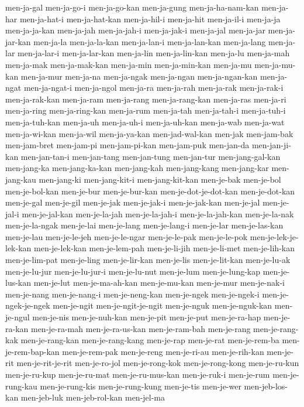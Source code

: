{men-ja-gal men-ja-go-i men-ja-go-kan men-ja-gung men-ja-ha-nam-kan
men-ja-har men-ja-hat-i men-ja-hat-kan men-ja-hil-i men-ja-hit men-ja-il-i
men-ja-ja men-ja-ja-kan men-ja-jah men-ja-jah-i men-ja-jak-i men-ja-jal
men-ja-jar men-ja-jar-kan men-ja-la men-ja-la-kan men-ja-lan-i
men-ja-lan-kan men-ja-lang men-ja-lar men-ja-lar-i men-ja-lar-kan
men-ja-lin men-ja-lin-kan men-ja-lu men-ja-mah men-ja-mak men-ja-mak-kan
men-ja-min men-ja-min-kan men-ja-mu men-ja-mu-kan men-ja-mur men-ja-na
men-ja-ngak men-ja-ngan men-ja-ngan-kan men-ja-ngat men-ja-ngat-i
men-ja-ngol men-ja-ra men-ja-rah men-ja-rak men-ja-rak-i men-ja-rak-kan
men-ja-ram men-ja-rang men-ja-rang-kan men-ja-ras men-ja-ri men-ja-ring
men-ja-ring-kan men-ja-rum men-ja-tah men-ja-tah-i men-ja-tuh-i
men-ja-tuh-kan men-ja-uh men-ja-uh-i men-ja-uh-kan men-ja-wab men-ja-wat
men-ja-wi-kan men-ja-wil men-ja-ya-kan men-jad-wal-kan men-jak men-jam-bak
men-jam-bret men-jam-pi men-jam-pi-kan men-jam-puk men-jan-da
men-jan-ji-kan men-jan-tan-i men-jan-tang men-jan-tung men-jan-tur
men-jang-gal-kan men-jang-ka men-jang-ka-kan men-jang-kah men-jang-kang
men-jang-kar men-jang-kau men-jang-ki men-jang-kit-i men-jang-kit-kan
men-je-bak men-je-bol men-je-bol-kan men-je-bur men-je-bur-kan
men-je-dot-je-dot-kan men-je-dot-kan men-je-gal men-je-gil men-je-jak
men-je-jak-i men-je-jak-kan men-je-jal men-je-jal-i men-je-jal-kan
men-je-la-jah men-je-la-jah-i men-je-la-jah-kan men-je-la-nak
men-je-la-ngak men-je-lai men-je-lang men-je-lang-i men-je-lar
men-je-las-kan men-je-lau men-je-le-jeh men-je-le-ngar men-je-le-pak
men-je-le-pok men-je-lek-je-lek-kan men-je-lek-kan men-je-lem-pah
men-je-li-jih men-je-li-met men-je-lih-kan men-je-lim-pat men-je-ling
men-je-lir-kan men-je-lis men-je-lit-kan men-je-lu-ak men-je-lu-jur
men-je-lu-jur-i men-je-lu-nut men-je-lum men-je-lung-kap men-je-lus-kan
men-je-lut men-je-ma-ah-kan men-je-mu-kan men-je-mur men-je-nak-i
men-je-nang men-je-nang-i men-je-neng-kan men-je-ngek men-je-ngek-i
men-je-ngek-je-ngek men-je-ngit men-je-ngit-je-ngit men-je-nguk
men-je-nguk-kan men-je-ngul men-je-nis men-je-nuh-kan men-je-pit
men-je-put men-je-ra-hap men-je-ra-kan men-je-ra-mah men-je-ra-us-kan
men-je-ram-bah men-je-rang men-je-rang-kak men-je-rang-kan
men-je-rang-kang men-je-rap men-je-rat men-je-rem-ba men-je-rem-bap-kan
men-je-rem-pak men-je-reng men-je-ri-au men-je-rih-kan men-je-rit
men-je-rit-je-rit men-je-ro-jol men-je-rong-kok men-je-rong-kong
men-je-ru-kun men-je-ru-kup men-je-ru-mat men-je-ru-mus-kan men-je-ruk-i
men-je-rum men-je-rung-kau men-je-rung-kis men-je-rung-kung men-je-tis
men-je-wer men-jeb-los-kan men-jeb-luk men-jeb-rol-kan men-jel-ma
}
